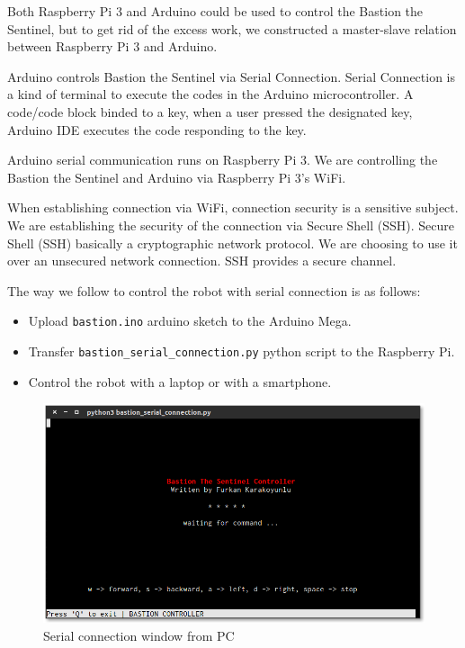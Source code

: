 \documentclass[12pt,a4paper]{article}
\begin{document}
Both Raspberry Pi 3 and Arduino could be used to control the Bastion the Sentinel, but to get rid of the excess work, 
we constructed a master-slave relation between Raspberry Pi 3 and Arduino. 

Arduino controls Bastion the Sentinel via Serial Connection. Serial Connection is a kind of terminal to execute the codes in 
the Arduino microcontroller. A code/code block binded to a key, when a user pressed the designated key, Arduino IDE executes the code 
responding to the key.

Arduino serial communication runs on Raspberry Pi 3. We are controlling the Bastion the Sentinel and Arduino via Raspberry Pi 3’s WiFi.

When establishing connection via WiFi, connection security is a sensitive subject. We are establishing the security of the connection via 
Secure Shell (SSH). Secure Shell (SSH) basically a cryptographic network protocol. We are choosing to use it over an unsecured network 
connection. SSH provides a secure channel.

The way we follow to control the robot with serial connection is as follows:
\begin{itemize}
 \item Upload \verb|bastion.ino| arduino sketch to the Arduino Mega.
 \item Transfer \verb|bastion_serial_connection.py| python script to the Raspberry Pi.
 \item Control the robot with a laptop or with a smartphone.
\end{itemize}

\begin{figure}[h!]
  \begin{center}
    \includegraphics[scale=0.5]{serial_pc}
    \caption{Serial connection window from PC}
  \end{center}
\end{figure}
\end{document}
